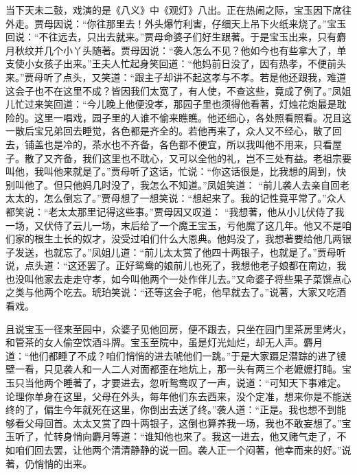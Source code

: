 \begin{parag}
    当下天未二鼓，戏演的是《八义》中《观灯》八出。正在热闹之际，宝玉因下席往外走。贾母因说：“你往那里去！外头爆竹利害，仔细天上吊下火纸来烧了。”宝玉回说：“不往远去，只出去就来。”贾母命婆子们好生跟著。于是宝玉出来，只有麝月秋纹并几个小丫头随著。贾母因说：“袭人怎么不见？他如今也有些拿大了，单支使小女孩子出来。”王夫人忙起身笑回道：“他妈前日没了，因有热孝，不便前头来。”贾母听了点头，又笑道：“跟主子却讲不起这孝与不孝。若是他还跟我，难道这会子也不在这里不成？皆因我们太宽了，有人使，不查这些，竟成了例了。”凤姐儿忙过来笑回道：“今儿晚上他便没孝，那园子里也须得他看著，灯烛花炮最是耽险的。这里一唱戏，园子里的人谁不偷来瞧瞧。他还细心，各处照看照看。况且这一散后宝兄弟回去睡觉，各色都是齐全的。若他再来了，众人又不经心，散了回去，铺盖也是冷的，茶水也不齐备，各色都不便宜，所以我叫他不用来，只看屋子。散了又齐备，我们这里也不耽心，又可以全他的礼，岂不三处有益。老祖宗要叫他，我叫他来就是了。”贾母听了这话，忙说：“你这话很是，比我想的周到，快别叫他了。但只他妈几时没了，我怎么不知道。”凤姐笑道： “前儿袭人去亲自回老太太的，怎么倒忘了。”贾母想了一想笑说：“想起来了。我的记性竟平常了。”众人都笑说：“老太太那里记得这些事。”贾母因又叹道： “我想著，他从小儿伏侍了我一场，又伏侍了云儿一场，末后给了一个魔王宝玉，亏他魔了这几年。他又不是咱们家的根生土长的奴才，没受过咱们什么大恩典。他妈没了，我想著要给他几两银子发送，也就忘了。”凤姐儿道：“前儿太太赏了他四十两银子，也就是了。”贾母听说，点头道：“这还罢了。正好鸳鸯的娘前儿也死了，我想他老子娘都在南边，我也没叫他家去走走守孝，如今叫他两个一处作伴儿去。”又命婆子将些果子菜馔点心之类与他两个吃去。琥珀笑说：“还等这会子呢，他早就去了。”说著，大家又吃酒看戏。
\end{parag}


\begin{parag}
    且说宝玉一径来至园中，众婆子见他回房，便不跟去，只坐在园门里茶房里烤火，和管茶的女人偷空饮酒斗牌。宝玉至院中，虽是灯光灿烂，却无人声。麝月道：“他们都睡了不成？咱们悄悄的进去唬他们一跳。”于是大家蹑足潜踪的进了镜壁一看，只见袭人和一人二人对面都歪在地炕上，那一头有两三个老嬷嬷打盹。宝玉只当他两个睡著了，才要进去，忽听鸳鸯叹了一声，说道：“可知天下事难定。论理你单身在这里，父母在外头，每年他们东去西来，没个定准，想来你是不能送终的了，偏生今年就死在这里，你倒出去送了终。”袭人道：“正是。我也想不到能够看父母回首。太太又赏了四十两银子，这倒也算养我一场，我也不敢妄想了。”宝玉听了，忙转身悄向麝月等道：“谁知他也来了。我这一进去，他又赌气走了，不如咱们回去罢，让他两个清清静静的说一回。袭人正一个闷著，他幸而来的好。”说著，仍悄悄的出来。
\end{parag}


